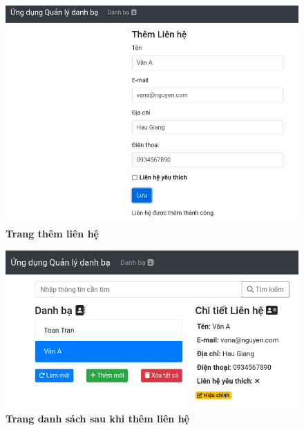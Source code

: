 {}
\setcounter{subsection}{5}
\setcounter{figure}{0}
\begin{figure}[H]
    \centering
    \includegraphics[width=15cm]{imgs/9.png}
    \caption{\bfseries Trang thêm liên hệ}
\end{figure}
\begin{figure}[H]
    \centering
    \includegraphics[width=15cm]{imgs/10.png}
    \caption{\bfseries Trang danh sách sau khi thêm liên hệ}
\end{figure}

